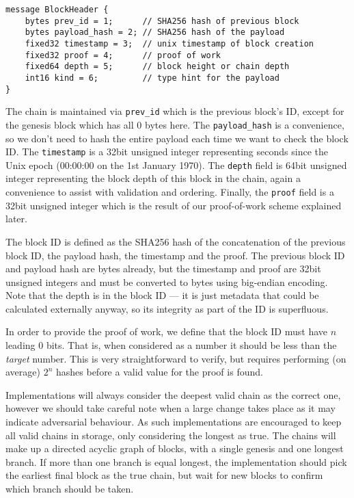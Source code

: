 \begin{verbatim}
message BlockHeader {
    bytes prev_id = 1;      // SHA256 hash of previous block
    bytes payload_hash = 2; // SHA256 hash of the payload
    fixed32 timestamp = 3;  // unix timestamp of block creation
    fixed32 proof = 4;      // proof of work
    fixed64 depth = 5;      // block height or chain depth
    int16 kind = 6;         // type hint for the payload
}
\end{verbatim}

The chain is maintained via \texttt{prev\_id} which is the previous block's ID, except for the genesis block which has all $0$ bytes here. The \texttt{payload\_hash} is a convenience, so we don't need to hash the entire payload each time we want to check the block ID. The \texttt{timestamp} is a 32bit unsigned integer representing seconds since the Unix epoch (00:00:00 on the 1st January 1970). The \texttt{depth} field is 64bit unsigned integer representing the block depth of this block in the chain, again a convenience to assist with validation and ordering. Finally, the \texttt{proof} field is a 32bit unsigned integer which is the result of our proof-of-work scheme explained later.

The block ID is defined as the SHA256 hash of the concatenation of the previous block ID, the payload hash, the timestamp and the proof. The previous block ID and payload hash are bytes already, but the timestamp and proof are 32bit unsigned integers and must be converted to bytes using big-endian encoding. Note that the depth is in the block ID --- it is just metadata that could be calculated externally anyway, so its integrity as part of the ID is superfluous.

In order to provide the proof of work, we define that the block ID must have $n$ leading 0 bits. That is, when considered as a number it should be less than the \emph{target} number. This is very straightforward to verify, but requires performing (on average) $2^n$ hashes before a valid value for the proof is found.




Implementations will always consider the deepest valid chain as the correct one, however we should take careful note when a large change takes place as it may indicate adversarial behaviour. As such implementations are encouraged to keep all valid chains in storage, only considering the longest as true. The chains will make up a directed acyclic graph of blocks, with a single genesis and one longest branch. If more than one branch is equal longest, the implementation should pick the earliest final block as the true chain, but wait for new blocks to confirm which branch should be taken.